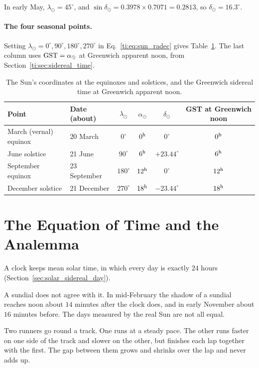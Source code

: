 In early May, $\lambda_\odot=45^\circ$, and $\sin\delta_\odot=0.3978\times0.7071=0.2813$, so $\delta_\odot=16.3^\circ$.

\paragraph{The four seasonal points.} Setting $\lambda_\odot=0^\circ,90^\circ,180^\circ,270^\circ$ in Eq.~\eqref{ti:eq:sun_radec} gives Table~\ref{ti:tab:seasons}. The last column uses $\mathrm{GST}=\alpha_\odot$ at Greenwich apparent noon, from Section~\ref{ti:sec:sidereal_time}.

\begin{table}[htbp]
	\centering
	\begin{tabular}{@{}l l c c c c@{}}
		\toprule
		\textbf{Point} & \textbf{Date (about)} & $\lambda_\odot$ & $\alpha_\odot$ & $\delta_\odot$ & \textbf{GST at Greenwich noon} \\
		\midrule
		March (vernal) equinox & 20 March & $0^\circ$ & $0^{\rm h}$ & $0^\circ$ & $0^{\rm h}$ \\
		June solstice & 21 June & $90^\circ$ & $6^{\rm h}$ & $+23.44^\circ$ & $6^{\rm h}$ \\
		September equinox & 23 September & $180^\circ$ & $12^{\rm h}$ & $0^\circ$ & $12^{\rm h}$ \\
		December solstice & 21 December & $270^\circ$ & $18^{\rm h}$ & $-23.44^\circ$ & $18^{\rm h}$ \\
		\bottomrule
	\end{tabular}
	\caption{The Sun's coordinates at the equinoxes and solstices, and the Greenwich sidereal time at Greenwich apparent noon.}
	\label{ti:tab:seasons}
\end{table}

\section{The Equation of Time and the Analemma}
\label{ti:sec:eot}

A clock keeps mean solar time, in which every day is exactly $24$ hours (Section~\ref{sec:solar_sidereal_day}).

A sundial does not agree with it. In mid-February the shadow of a sundial reaches noon about $14$ minutes after the clock does, and in early November about $16$ minutes before. The days measured by the real Sun are not all equal.

Two runners go round a track. One runs at a steady pace. The other runs faster on one side of the track and slower on the other, but finishes each lap together with the first. The gap between them grows and shrinks over the lap and never adds up.

